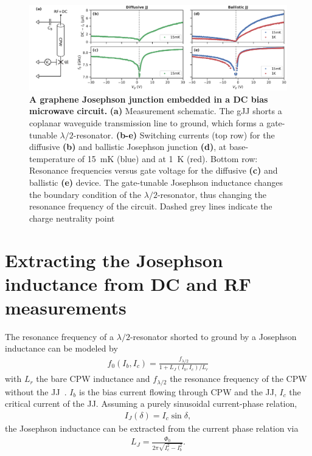 \begin{figure}
	\centering
	\includegraphics[width=\linewidth]{chapter-gJJ-CPR/figs/Figure1}
	\caption{
		\textbf{A graphene Josephson junction embedded in a DC bias microwave circuit.}
		\textbf{(a)} Measurement schematic.
		The gJJ shorts a coplanar waveguide transmission line to ground, which forms a gate-tunable $\lambda/2$-resonator.
		\textbf{(b-e)} Switching currents (top row) for the diffusive \textbf{(b)} and ballistic Josephson junction \textbf{(d)}, at base-temperature of \SI{15}{\milli\kelvin} (blue) and at \SI{1}{\kelvin} (red).
		Bottom row: Resonance frequencies versus gate voltage for the diffusive \textbf{(c)} and ballistic \textbf{(e)} device.
		The gate-tunable Josephson inductance changes the boundary condition of the $\lambda/2$-resonator, thus changing the resonance frequency of the circuit.
		Dashed grey lines indicate the charge neutrality point
	}
	\label{fig:figure1}
\end{figure}

\section{Extracting the Josephson inductance from DC and RF measurements}

The resonance frequency of a $\lambda/2$-resonator shorted to ground by a Josephson inductance can be modeled by
\begin{align}
f_0(I_b,I_c) = \frac{f_{\lambda/2}}{1 +  L_J(I_b, I_c)/L_r}
\label{eq:Pogorzalek}
\end{align}
%
with $L_r$ the bare CPW inductance and $f_{\lambda/2}$ the resonance frequency of the CPW without the JJ~\cite{pogorzalekHystereticFluxResponse2017}.
%
$I_b$ is the bias current flowing through CPW and the JJ, $I_c$ the critical current of the JJ.
%
Assuming a purely sinusoidal current-phase relation,
%
\begin{align}
I_J(\delta) = I_c\sin\delta,
\label{eq:CPR-sin}
\end{align}
%
the Josephson inductance can be extracted from the current phase relation via
%
\begin{align}
L_J = \frac{\Phi_0}{2\pi\sqrt{I_c^2-I_b^2}}.
\end{align}

